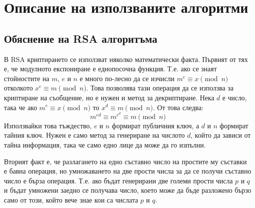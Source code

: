 \section{Описание на използваните алгоритми} \label{algos}
  \subsection{Обяснение на RSA алгоритъма} \label{rsa}
  В RSA криптирането се използват няколко математически факта. Първият от тях е, че модулното експониране е еднопосочна функция. Т.е. ако се знаят стойностите на $m$, $e$ и $n$ е много по-лесно да се изчисли $m^e \equiv x \pmod{n}$ отколкото $x^e \equiv m \pmod{n}$. Това позволява тази операция да се използва за криптиране на съобщение, но е нужен и метод за декриптиране. Нека $d$ е число, така че ако $m^e \equiv x \pmod{n}$ то $x^d \equiv m \pmod{n}$. От това следва:
  \begin{equation}
    m^{ed} \equiv m^{e^d} \equiv m \pmod{n}
    \label{rsa-key-cancelation}
  \end{equation}
  Използвайки това тъждество, $e$ и $n$ формират публичния ключ, а $d$ и $n$ формират тайния ключ. Нужен е само метод за генериране на числото $d$, който да зависи от тайна информация, така че само едно лице да може да го изпълни.

  Вторият факт е, че разлагането на едно съставно число на простите му съставки е бавна операция, но умножаването на две прости числа за да се получи съставно число е бърза операция. Т.е. ако бъдат генерирани две големи прости числа $p$ и $q$ и бъдат умножени заедно се получава число, което може да бъде разложено бързо само от този, който вече знае кои са числата $p$ и $q$.

